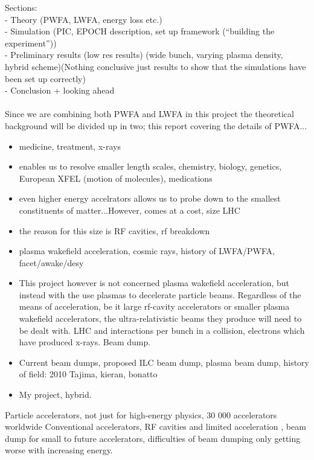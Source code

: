 Sections:\\
- Theory (PWFA, LWFA, energy loss etc.)\\
- Simulation (PIC, EPOCH description, set up framework (“building the experiment”))\\
- Preliminary results (low res results) (wide bunch, varying plasma density, hybrid scheme)(Nothing conclusive just results to show that the simulations have been set up correctly)\\
- Conclusion + looking ahead\\
\\
Since we are combining both PWFA and LWFA in this project the theoretical background will be divided up in two; this report covering the details of PWFA...\\
\clearpage
\begin{itemize}
\item medicine, treatment, x-rays 
\item enables us to resolve smaller length scales, chemistry, biology, genetics, European XFEL (motion of molecules), medications
\item even higher energy accelrators allows us to probe down to the smallest constituents of matter...However, comes at a cost, size LHC
\item the reason for this size is RF cavities, rf breakdown
\item plasma wakefield acceleration, cosmic rays, history of LWFA/PWFA, facet/awake/desy
\item This project however is not concerned plasma wakefield acceleration, but instead with the use plasmas to decelerate particle beams. Regardless of the means of acceleration, be it large rf-cavity accelerators or smaller plasma wakefield accelerators, the ultra-relativistic beams they produce will need to be dealt with. LHC and interactions per bunch in a collision, electrons which have produced x-rays. Beam dump. 
\item Current beam dumps, proposed ILC beam dump, plasma beam dump, history of field: 2010 Tajima, kieran, bonatto
\item My project, hybrid. 
\end{itemize} 
Particle accelerators, not just for high-energy physics, 30 000 accelerators worldwide
Conventional accelerators, RF cavities and limited acceleration , beam dump for small to future accelerators, difficulties of beam dumping only getting worse with increasing energy. \\

